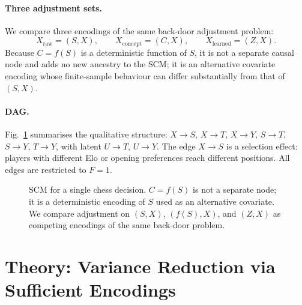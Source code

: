 \documentclass{article}
\begin{document}
\paragraph{Three adjustment sets.}
We compare three encodings of the same back-door adjustment problem:
\[
X_{\text{raw}}=(S,X),\qquad X_{\text{concept}}=(C,X),\qquad X_{\text{learned}}=(Z,X).
\]
Because $C=f(S)$ is a deterministic function of $S$, it is not a separate causal
node and adds no new ancestry to the SCM; it is an alternative covariate
encoding whose finite-sample behaviour can differ substantially from that of
$(S,X)$.

\paragraph{DAG.}
Fig.~\ref{fig:scm_chess} summarises the qualitative structure: $X\to S$,
$X\to T$, $X\to Y$, $S\to T$, $S\to Y$, $T\to Y$, with latent $U\to T$,
$U\to Y$. The edge $X\to S$ is a selection effect: players with different Elo
or opening preferences reach different positions. All edges are restricted to
$F=1$.

\begin{figure}[t]
\centering
{}
\caption{SCM for a single chess decision. $C=f(S)$ is not a separate node; it is
a deterministic encoding of $S$ used as an alternative covariate. We compare
adjustment on $(S,X)$, $(f(S),X)$, and $(Z,X)$ as competing encodings of the
same back-door problem.}
\label{fig:scm_chess}
\end{figure}

\section{Theory: Variance Reduction via Sufficient Encodings}
\label{sec:theory}
\end{document}
